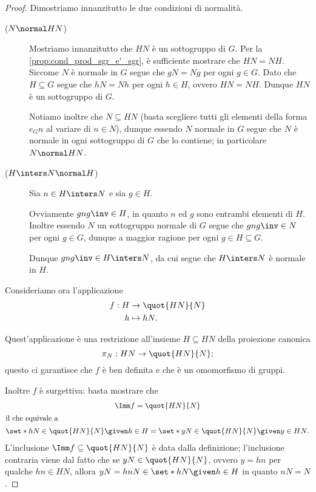 \begin{proof}
    Dimostriamo innanzitutto le due condizioni di normalità.
    \begin{description}
        \item[($N \normal HN$)] Mostriamo innanzitutto che $HN$ è un sottogruppo di $G$. Per la \autoref{prop:cond_prod_sgr_e'_sgr}, è sufficiente mostrare che $HN = NH$. 
        Siccome $N$ è normale in $G$ segue che $gN = Ng$ per ogni $g \in G$. Dato che $H \subseteq G$ segue che $hN = Nh$ per ogni $h \in H$, ovvero $HN = NH$.
        Dunque $HN$ è un sottogruppo di $G$.

        Notiamo inoltre che $N \subseteq HN$ (basta scegliere tutti gli elementi della forma $e_Gn$ al variare di $n \in N$), dunque essendo $N$ normale in $G$ segue che $N$ è normale in ogni sottogruppo di $G$ che lo contiene; in particolare $N \normal HN$.
        \item[($H \inters N \normal H$)] Sia $n \in H \inters N$ e sia $g \in H$.
        
        Ovviamente $gng\inv \in H$, in quanto $n$ ed $g$ sono entrambi elementi di $H$. Inoltre essendo $N$ un sottogruppo normale di $G$ segue che $gng\inv \in N$ per ogni $g \in G$, dunque a maggior ragione per ogni $g \in H \subseteq G$. 
        
        Dunque $gng\inv \in H \inters N$, da cui segue che $H \inters N$ è normale in $H$.
    \end{description}
    Consideriamo ora l'applicazione 
    \begin{align*}
        \begin{split}
            f : H &\to \quot{HN}{N} \\
            h &\mapsto hN.
        \end{split}
    \end{align*}  

    Quest'applicazione è una restrizione all'insieme $H \subseteq HN$ della proiezione canonica \[
        \pi_{N} : HN \to \quot{HN}{N};    
    \] questo ci garantisce che $f$ è ben definita e che è un omomorfismo di gruppi.
    
    Inoltre $f$ è surgettiva: basta mostrare che \begin{gather*}
        \Imm f = \quot{HN}{N}\\
        \intertext{il che equivale a}
        \set*{hN \in \quot{HN}{N} \given h \in H} = \set*{yN \in \quot{HN}{N} \given y \in HN}.
    \end{gather*}
    L'inclusione $\Imm f \subseteq \quot{HN}{N}$ è data dalla definizione; l'inclusione contraria viene dal fatto che se $yN \in \quot{HN}{N}$, ovvero $y = hn$ per qualche $hn \in HN$, allora $yN = hnN \in \set*{hN \given h \in H}$ in quanto $nN = N$.


\end{proof}
